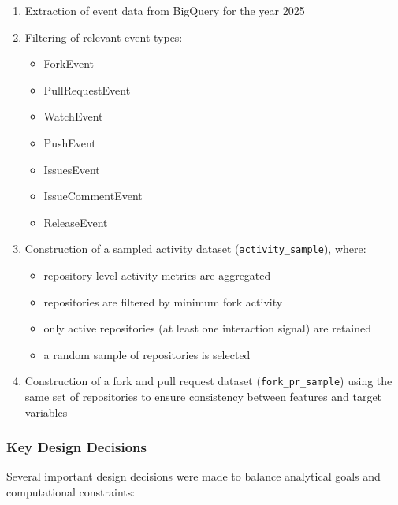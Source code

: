 \begin{enumerate}
    \item Extraction of event data from BigQuery for the year 2025
    \item Filtering of relevant event types:
    \begin{itemize}
        \item ForkEvent
        \item PullRequestEvent
        \item WatchEvent
        \item PushEvent
        \item IssuesEvent
        \item IssueCommentEvent
        \item ReleaseEvent
    \end{itemize}
    \item Construction of a sampled activity dataset (\texttt{activity\_sample}), where:
    \begin{itemize}
        \item repository-level activity metrics are aggregated
        \item repositories are filtered by minimum fork activity
        \item only active repositories (at least one interaction signal) are retained
        \item a random sample of repositories is selected
    \end{itemize}
    \item Construction of a fork and pull request dataset (\texttt{fork\_pr\_sample}) using the same set of repositories to ensure consistency between features and target variables
\end{enumerate}

\subsubsection{Key Design Decisions}

Several important design decisions were made to balance analytical goals and computational constraints:

